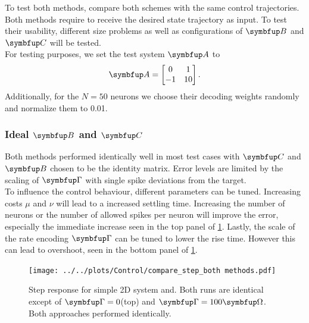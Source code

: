 To test both methods, compare both schemes with the same control trajectories.\\
Both methods require to receive the desired state trajectory as input. To test their usability, different size problems as well as configurations of $\bmu{B}$ and $\bmu{C}$ will be tested.\\
For testing purposes, we set the test system $\bmu{A}$ to
\begin{equation}
	\bmu{A} = \begin{bmatrix}0 & 1\\-1 & 10\\\end{bmatrix}.
\end{equation}
Additionally, for the $N=50$ neurons we choose their decoding weights randomly and normalize them to 0.01.

\subsubsection{Ideal $\bmu{B}$ and $\bmu{C}$}
Both methods performed identically well in most test cases with $\bmu{C}$ and $\bmu{B}$ chosen to be the identity matrix. Error levels are limited by the scaling of $\bmu{\Gamma}$ with single spike deviations from the target. \\
To influence the control behaviour, different parameters can be tuned. Increasing costs $\mu$ and $\nu$ will lead to a increased settling time. Increasing the number of neurons or the number of allowed spikes per neuron will improve the error, especially the immediate increase seen in the top panel of \cref{fig:step_compare}. Lastly, the scale of the rate encoding $\bmu{\Gamma}$ can be tuned to lower the rise time. However this can lead to overshoot, seen in the bottom panel of \cref{fig:step_compare}.\\
\begin{figure}
	\centering
	\texttt{[image: ../../plots/Control/compare\_step\_both methods.pdf]}
	\caption{Step response for simple 2D system and. Both runs are identical except of $\bmu{\Gamma} = 0$(top) and $\bmu{\Gamma} = 100\bmu{\Omega}$. Both approaches performed identically.}
	\label{fig:step_compare}
\end{figure}


